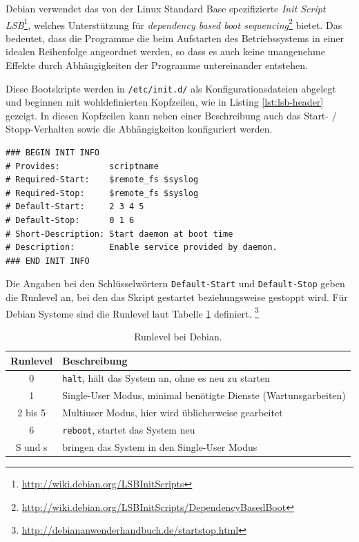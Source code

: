 Debian verwendet das von der Linux Standard Base spezifizierte
\emph{Init Script LSB}\footnote{
\url{http://wiki.debian.org/LSBInitScripts}}, welches Unterstützung
für \emph{dependency based boot sequencing}\footnote{
\url{http://wiki.debian.org/LSBInitScripts/DependencyBasedBoot}
} bietet. Das bedeutet, dass
die Programme die beim Aufstarten des Betriebssystems in einer idealen
Reihenfolge angeordnet werden, so dass es auch keine unangenehme Effekte
durch Abhängigkeiten der Programme untereinander entstehen.

Diese Bootskripte werden in {\tt /etc/init.d/} als Konfigurationsdateien
abgelegt und beginnen mit wohldefinierten Kopfzeilen, wie in Listing
\ref{lst:lsb-header} gezeigt.
In diesen Kopfzeilen kann neben einer Beschreibung auch das
Start- / Stopp-Verhalten sowie die Abhängigkeiten konfiguriert werden.

\begin{lstlisting}[label=lst:lsb-header,caption={Init Script LSB: Kopfzeilen.}]
### BEGIN INIT INFO
# Provides:          scriptname
# Required-Start:    $remote_fs $syslog
# Required-Stop:     $remote_fs $syslog
# Default-Start:     2 3 4 5
# Default-Stop:      0 1 6
# Short-Description: Start daemon at boot time
# Description:       Enable service provided by daemon.
### END INIT INFO
\end{lstlisting}

Die Angaben bei den Schlüsselwörtern {\tt Default-Start} und {\tt Default-Stop}
geben die Runlevel an, bei den das Skript gestartet beziehungsweise gestoppt
wird.
Für Debian Systeme sind die Runlevel laut Tabelle \ref{tab.runlevel} definiert.
\footnote{
\url{http://debiananwenderhandbuch.de/startstop.html}
}

\begin{table}[htb]
    \centering
    \begin{tabular}{|c|l|}
        \hline
        Runlevel & Beschreibung\\
        \hline
        0       & {\tt halt}, hält das System an, ohne es neu zu starten\\
        1       & Single-User Modus, minimal benötigte Dienste (Wartunsgarbeiten)\\
        2 bis 5 & Multiuser Modus, hier wird üblicherweise gearbeitet\\
        6       & {\tt reboot}, startet das System neu\\
        S und s & bringen das System in den Single-User Modus\\
        \hline
    \end{tabular}
   \caption{Runlevel bei Debian.}\label{tab.runlevel}
\end{table}

